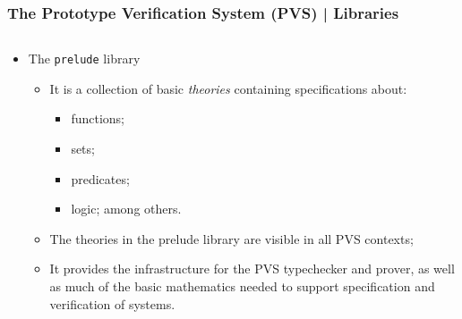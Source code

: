 \documentclass[10pt]{beamer}
\begin{document}
\begin{frame}
\frametitle{The Prototype Verification System (PVS) | Libraries }
\begin{columns}
\begin{column}{11cm}
\begin{itemize}
\item {\color{red}The {\tt prelude} library} 
\begin{itemize}
\item It is a collection of basic \emph{theories} containing specifications about:
\begin{itemize}
\item functions;
\item sets;
\item predicates;
\item logic; among others.
\end{itemize}
\item The theories in the prelude library are visible in all PVS contexts;
\item It provides the infrastructure for the PVS typechecker and prover, as well as much of the basic mathematics needed to support specification and verification of systems.
\end{itemize} 
\end{itemize}

\end{column}
\end{columns}
\end{frame}
\end{document}
